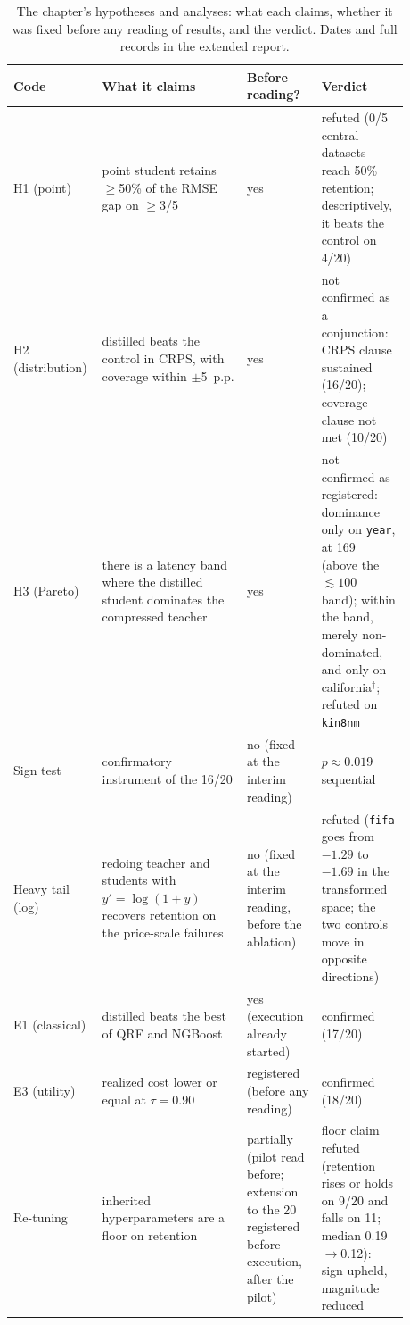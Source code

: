 \begin{table}[htb]
\centering
\caption[The chapter's hypotheses and registration status]{The
chapter's hypotheses and analyses: what each claims, whether it was
fixed before any reading of results, and the verdict. Dates and full
records in the extended report.}
\label{tab:destil-hipoteses}
\small
\begin{tabular}{>{\raggedright\arraybackslash}p{0.14\linewidth}>{\raggedright\arraybackslash}p{0.35\linewidth}>{\raggedright\arraybackslash}p{0.18\linewidth}>{\raggedright\arraybackslash}p{0.21\linewidth}}
\toprule
Code & What it claims & Before reading? & Verdict \\
\midrule
H1 (point) & point student retains $\geq$50\% of the RMSE gap on
$\geq$3/5 & yes & refuted (0/5 central datasets reach 50\%
retention; descriptively, it beats the control on 4/20) \\
\addlinespace[2pt]
H2 (distribution) & distilled beats the control in CRPS, with
coverage within $\pm$5~p.p. & yes & not confirmed as a conjunction:
CRPS clause sustained (16/20); coverage clause not met (10/20) \\
\addlinespace[2pt]
H3 (Pareto) & there is a latency band where the distilled student
dominates the compressed teacher & yes & not confirmed as
registered: dominance only on \texttt{year}, at 169~\us{} (above
the ${\lesssim}100$ band); within the band, merely non-dominated,
and only on california$^\dagger$; refuted on \texttt{kin8nm} \\
\addlinespace[2pt]
Sign test & confirmatory instrument of the 16/20 & no (fixed at the
interim reading) & $p\approx0.019$ sequential \\
\addlinespace[2pt]
Heavy tail (log) & redoing teacher and students with
$y'{=}\log(1{+}y)$ recovers retention on the price-scale failures &
no (fixed at the interim reading, before the ablation) & refuted
(\texttt{fifa} goes from $-1.29$ to $-1.69$ in the transformed
space; the two controls move in opposite directions) \\
\addlinespace[2pt]
E1 (classical) & distilled beats the best of QRF and NGBoost & yes
(execution already started) & confirmed (17/20) \\
\addlinespace[2pt]
E3 (utility) & realized cost lower or equal at $\tau{=}0.90$ &
registered (before any reading) & confirmed (18/20) \\
\addlinespace[2pt]
Re-tuning & inherited hyperparameters are a floor on retention &
partially (pilot read before; extension to the 20 registered
before execution, after the pilot) & floor claim refuted (retention rises or holds on 9/20 and falls on 11; median 0.19$\to$0.12): sign upheld, magnitude reduced \\
\bottomrule
\end{tabular}
\end{table}

